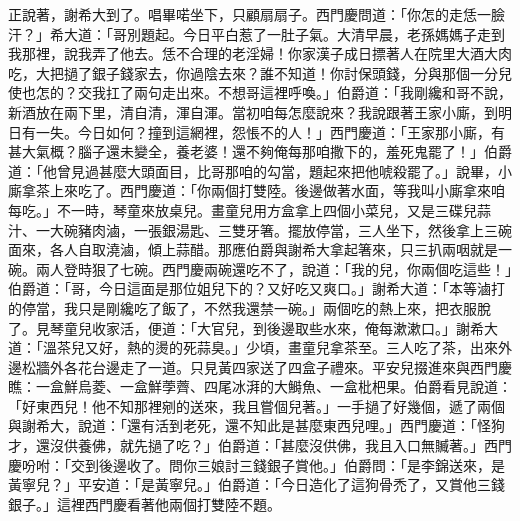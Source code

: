 正說著，謝希大到了。唱畢喏坐下，只顧扇扇子。西門慶問道：「你怎的走恁一臉汗？」希大道：「哥別題起。今日平白惹了一肚子氣。大清早晨，老孫媽媽子走到我那裡，說我弄了他去。恁不合理的老淫婦！你家漢子成日摽著人在院里大酒大肉吃，大把撾了銀子錢家去，你過陰去來？誰不知道！你討保頭錢，分與那個一分兒使也怎的？交我扛了兩句走出來。不想哥這裡呼喚。」伯爵道：「我剛纔和哥不說，新酒放在兩下里，清自清，渾自渾。當初咱每怎麼說來？我說跟著王家小廝，到明日有一失。今日如何？撞到這網裡，怨悵不的人！」西門慶道：「王家那小廝，有甚大氣概？腦子還未變全，養老婆！還不夠俺每那咱撒下的，羞死鬼罷了！」伯爵道：「他曾見過甚麼大頭面目，比哥那咱的勾當，題起來把他唬殺罷了。」說畢，小廝拿茶上來吃了。西門慶道：「你兩個打雙陸。後邊做著水面，等我叫小廝拿來咱每吃。」不一時，琴童來放桌兒。畫童兒用方盒拿上四個小菜兒，又是三碟兒蒜汁、一大碗豬肉滷，一張銀湯匙、三雙牙箸。擺放停當，三人坐下，然後拿上三碗面來，各人自取澆滷，傾上蒜醋。那應伯爵與謝希大拿起箸來，只三扒兩咽就是一碗。兩人登時狠了七碗。西門慶兩碗還吃不了，說道：「我的兒，你兩個吃這些！」伯爵道：「哥，今日這面是那位姐兒下的？又好吃又爽口。」謝希大道：「本等滷打的停當，我只是剛纔吃了飯了，不然我還禁一碗。」兩個吃的熱上來，把衣服脫了。見琴童兒收家活，便道：「大官兒，到後邊取些水來，俺每漱漱口。」謝希大道：「溫茶兒又好，熱的燙的死蒜臭。」少頃，畫童兒拿茶至。三人吃了茶，出來外邊松牆外各花台邊走了一道。只見黃四家送了四盒子禮來。平安兒掇進來與西門慶瞧：一盒鮮烏菱、一盒鮮荸薺、四尾冰湃的大鰣魚、一盒枇杷果。伯爵看見說道：「好東西兒！他不知那裡剜的送來，我且嘗個兒著。」一手撾了好幾個，遞了兩個與謝希大，說道：「還有活到老死，還不知此是甚麼東西兒哩。」西門慶道：「怪狗才，還沒供養佛，就先撾了吃？」伯爵道：「甚麼沒供佛，我且入口無贓著。」西門慶吩咐：「交到後邊收了。問你三娘討三錢銀子賞他。」伯爵問：「是李錦送來，是黃寧兒？」平安道：「是黃寧兒。」伯爵道：「今日造化了這狗骨禿了，又賞他三錢銀子。」這裡西門慶看著他兩個打雙陸不題。

